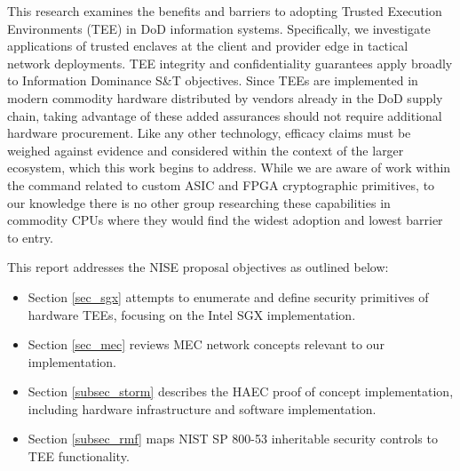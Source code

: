 This research examines the benefits and barriers to adopting Trusted Execution Environments (TEE) in DoD information systems. Specifically, we investigate applications of trusted enclaves at the client and provider edge in tactical network deployments. TEE integrity and confidentiality guarantees apply broadly to Information Dominance S\&T objectives. Since TEEs are implemented in modern commodity hardware distributed by vendors already in the DoD supply chain, taking advantage of these added assurances should not require additional hardware procurement. Like any other technology, efficacy claims must be weighed against evidence and considered within the context of the larger ecosystem, which this work begins to address. While we are aware of work within the command related to custom ASIC and FPGA cryptographic primitives, to our knowledge there is no other group researching these capabilities in commodity CPUs where they would find the widest adoption and lowest barrier to entry. 

This report addresses the NISE proposal objectives as outlined below:
\begin{itemize}
\item Section \ref{sec_sgx} attempts to enumerate and define security primitives of hardware TEEs, focusing on the Intel SGX implementation. 
\item Section \ref{sec_mec} reviews MEC network concepts relevant to our implementation.
\item Section \ref{subsec_storm} describes the HAEC proof of concept implementation, including hardware infrastructure and software implementation. 
\item Section \ref{subsec_rmf} maps NIST SP 800-53 inheritable security controls to TEE functionality.
\end{itemize}


